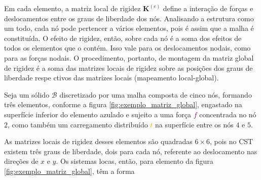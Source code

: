 Em cada elemento, a matriz local de rigidez $\bm{K}^{(e)}$ define a interação de forças e deslocamentos entre os graus de liberdade dos nós. Analisando a estrutura como um todo, cada nó pode pertencer a vários elementos, pois é assim que a malha é constituída. O efeito de rigidez, então, sobre cada nó é a soma dos efeitos de todos os elementos que o contém. Isso vale para os deslocamentos nodais, como para as forças nodais. O procedimento, portanto, de montagem da matriz global de rigidez é a soma das matrizes locais de rigidez sobre as posições dos graus de liberdade respe    ctivos das matrizes locais (mapeamento local-global).

Seja um sólido $\mathcal{B}$ discretizado por uma malha composta de cinco nós, formando três elementos, conforme a figura \ref{fig:exemplo_matriz_global}, engastado na superfície inferior do elemento azulado e sujeito a uma força \textcolor{purple}{$f$} concentrada no nó $2$, como também um carregamento distribuído \textcolor{orange}{$t$} na superfície entre os nós $4$ e $5$.




As matrizes locais de rigidez desses elementos são quadradas $6 \times 6$, pois no CST existem três graus de liberdade, dois para cada nó, referente ao deslocamento nas direções de $x$ e $y$. Os sistemas locas, então, para elemento da figura \ref{fig:exemplo_matriz_global}, têm a forma

